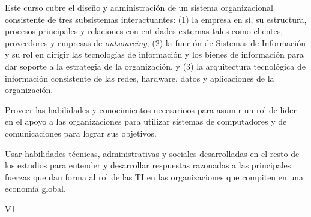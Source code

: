 \begin{syllabus}


\begin{justification}
	Este curso cubre el diseño y administración de un sistema organizacional consistente de tres subsistemas interactuantes: (1) la empresa en sí, su estructura, procesos principales y relaciones con entidades externas tales como clientes, proveedores y empresas de \emph{outsourcing}; (2) la función de Sistemas de Información y su rol en dirigir las tecnologías de información y los bienes de información para dar soporte a la estrategia de la organización, y (3) la arquitectura tecnológica de información consistente de las redes, hardware, datos y aplicaciones de la organización. 
	\end{justification}
	
	\begin{goals}
	\item Proveer las habilidades y conocimientos necesarioos para asumir un rol de lider en el apoyo a las organizaciones para utilizar sistemas de computadores y de comunicaciones para lograr sus objetivos. 
	\item Usar habilidades técnicas, administrativas y sociales desarrolladas en el resto de los estudios para entender y desarrollar respuestas razonadas a las principales fuerzas que dan forma al rol de las TI en las organizaciones que compiten en una economía global.
	\end{goals}
	
	\begin{outcomes}{V1}
		\item {}
		\item {}
		\item {}
		\item {}
		\item {}
		\item {}
		\item {}
		\item {}
		\item {}
	\end{outcomes}
	

\end{syllabus}
